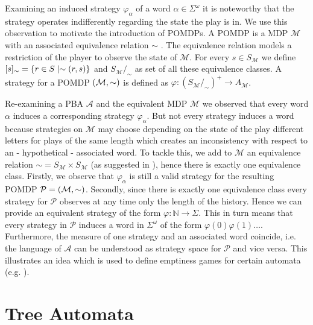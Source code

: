 Examining an induced strategy $\varphi_{\alpha}$ of a word
$\alpha\in\Sigma^{\omega}$ it is noteworthy that the strategy operates
indifferently regarding the state the play is in. We use this observation to
motivate the introduction of \acp{POMDP}. A \ac{POMDP} is a \ac{MDP}
$\mathcal{M}$ with an associated equivalence relation $\sim$
\cite{RandAutoInfTrees}. The equivalence relation models a restriction of the
player to observe the state of $\mathcal{M}$. For every
$s\in S_{\mathcal{M}}$ we define
$[s]_{\sim} = \left\{r\in S\mid \sim(r,s)\right\}$ and
$S_{\mathcal{M}}/_{\sim}$ as set of all these equivalence classes. A
strategy for a \ac{POMDP} $\left(\mathcal{M}, \sim\right)$ is defined as
$\varphi:(S_{\mathcal{M}}/_{\sim})^{+}\rightarrow A_{\mathcal{M}}$.
\begin{example}
  Re-examining a \ac{PBA} $\mathcal{A}$ and the equivalent \ac{MDP}
  $\mathcal{M}$ we observed that every word $\alpha$ induces a corresponding
  strategy $\varphi_{\alpha}$. But not every strategy induces a word because
  strategies on $\mathcal{M}$ may choose depending on the state of the play
  different letters for plays of the same length which creates an inconsistency
  with respect to an - hypothetical - associated word. To tackle this, we add
  to $\mathcal{M}$ an equivalence relation
  $\sim = S_{\mathcal{M}} \times S_{\mathcal{M}}$ (as suggested in
  \cite{DecProblemsForProbAuto}), hence there is exactly one equivalence class.
  Firstly, we observe that $\varphi_{\alpha}$ is still a valid strategy for the
  resulting \ac{POMDP} $\mathcal{P} = \left(\mathcal{M}, \sim\right)$. Secondly,
  since there is exactly one equivalence class every strategy for $\mathcal{P}$
  observes at any time only the length of the history. Hence we can provide an
  equivalent strategy of the form $\varphi:\mathbb{N}\rightarrow \Sigma$. This
  in turn means that every strategy in $\mathcal{P}$ induces a word in
  $\Sigma^{\omega}$ of the form $\varphi(0)\varphi(1)\dots$. Furthermore, the
  measure of one strategy and an associated word coincide, i.e. the language of
  $\mathcal{A}$ can be understood as strategy space for $\mathcal{P}$ and vice
  versa. This illustrates an idea which is used to define emptiness games for
  certain automata (e.g. \cite[Proposition 45]{RandAutoInfTrees}).
  \label{ex:pba}
\end{example}

\section{Tree Automata}
